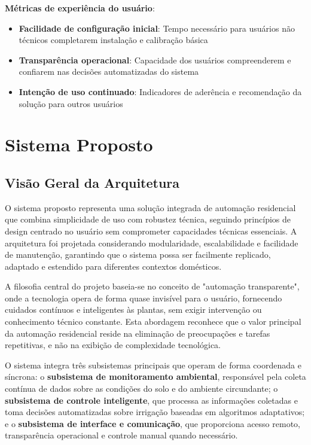 \textbf{Métricas de experiência do usuário}:
\begin{itemize}
\item \textbf{Facilidade de configuração inicial}: Tempo necessário para usuários não técnicos completarem instalação e calibração básica
\item \textbf{Transparência operacional}: Capacidade dos usuários compreenderem e confiarem nas decisões automatizadas do sistema
\item \textbf{Intenção de uso continuado}: Indicadores de aderência e recomendação da solução para outros usuários
\end{itemize}

\chapter{Sistema Proposto}

\section{Visão Geral da Arquitetura}

O sistema proposto representa uma solução integrada de automação residencial que combina simplicidade de uso com robustez técnica, seguindo princípios de design centrado no usuário sem comprometer capacidades técnicas essenciais. A arquitetura foi projetada considerando modularidade, escalabilidade e facilidade de manutenção, garantindo que o sistema possa ser facilmente replicado, adaptado e estendido para diferentes contextos domésticos.

A filosofia central do projeto baseia-se no conceito de "automação transparente", onde a tecnologia opera de forma quase invisível para o usuário, fornecendo cuidados contínuos e inteligentes às plantas, sem exigir intervenção ou conhecimento técnico constante. Esta abordagem reconhece que o valor principal da automação residencial reside na eliminação de preocupações e tarefas repetitivas, e não na exibição de complexidade tecnológica.

O sistema integra três subsistemas principais que operam de forma coordenada e síncrona: o \textbf{subsistema de monitoramento ambiental}, responsável pela coleta contínua de dados sobre as condições do solo e do ambiente circundante; o \textbf{subsistema de controle inteligente}, que processa as informações coletadas e toma decisões automatizadas sobre irrigação baseadas em algoritmos adaptativos; e o \textbf{subsistema de interface e comunicação}, que proporciona acesso remoto, transparência operacional e controle manual quando necessário.

